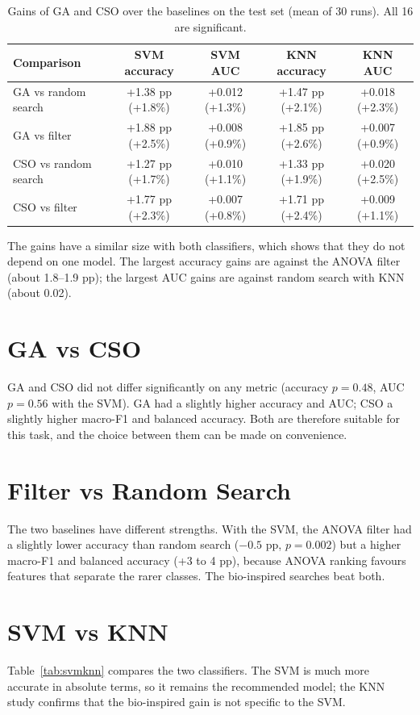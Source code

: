 \documentclass[12pt,a4paper]{report}
\begin{document}
\begin{table}[H]
\centering
\caption{Gains of GA and CSO over the baselines on the test set (mean of 30 runs). All 16 are significant.}
\label{tab:gains}
\footnotesize
\setlength{\tabcolsep}{3.5pt}
\begin{tabular}{|l|c|c|c|c|}
\hline
\textbf{Comparison} & \textbf{SVM accuracy} & \textbf{SVM AUC} & \textbf{KNN accuracy} & \textbf{KNN AUC} \\
\hline
GA vs random search & +1.38 pp (+1.8\%) & +0.012 (+1.3\%) & +1.47 pp (+2.1\%) & +0.018 (+2.3\%) \\
\hline
GA vs filter & +1.88 pp (+2.5\%) & +0.008 (+0.9\%) & +1.85 pp (+2.6\%) & +0.007 (+0.9\%) \\
\hline
CSO vs random search & +1.27 pp (+1.7\%) & +0.010 (+1.1\%) & +1.33 pp (+1.9\%) & +0.020 (+2.5\%) \\
\hline
CSO vs filter & +1.77 pp (+2.3\%) & +0.007 (+0.8\%) & +1.71 pp (+2.4\%) & +0.009 (+1.1\%) \\
\hline
\end{tabular}
\end{table}

The gains have a similar size with both classifiers, which shows that they do not depend on one model. The largest
accuracy gains are against the ANOVA filter (about 1.8--1.9 pp); the largest AUC gains are against random search with
KNN (about 0.02).

\section{GA vs CSO}
GA and CSO did not differ significantly on any metric (accuracy $p = 0.48$, AUC $p = 0.56$ with the SVM). GA had a
slightly higher accuracy and AUC; CSO a slightly higher macro-F1 and balanced accuracy. Both are therefore suitable
for this task, and the choice between them can be made on convenience.

\section{Filter vs Random Search}
The two baselines have different strengths. With the SVM, the ANOVA filter had a slightly lower accuracy than random
search ($-0.5$ pp, $p = 0.002$) but a higher macro-F1 and balanced accuracy (+3 to 4 pp), because ANOVA ranking
favours features that separate the rarer classes. The bio-inspired searches beat both.

\section{SVM vs KNN}
Table~\ref{tab:svmknn} compares the two classifiers. The SVM is much more accurate in absolute terms, so it remains
the recommended model; the KNN study confirms that the bio-inspired gain is not specific to the SVM.
\end{document}
